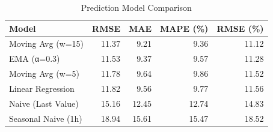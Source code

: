 \begin{table}[h]
\centering
\caption{Prediction Model Comparison}
\label{tab:model-comparison}
\begin{tabular}{lrrrr}
\toprule
Model & RMSE & MAE & MAPE (\%) & RMSE (\%) \\
\midrule
Moving Avg (w=15) & 11.37 & 9.21 & 9.36 & 11.12 \\
EMA (α=0.3) & 11.53 & 9.37 & 9.57 & 11.28 \\
Moving Avg (w=5) & 11.78 & 9.64 & 9.86 & 11.52 \\
Linear Regression & 11.82 & 9.56 & 9.77 & 11.56 \\
Naive (Last Value) & 15.16 & 12.45 & 12.74 & 14.83 \\
Seasonal Naive (1h) & 18.94 & 15.61 & 15.47 & 18.52 \\
\bottomrule
\end{tabular}
\end{table}